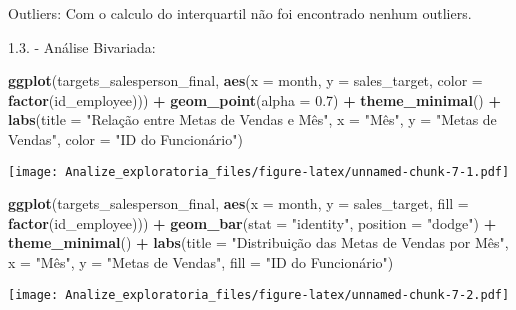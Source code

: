 \documentclass[
]{article}
\newenvironment{Shaded}{\begin{snugshade}}{\end{snugshade}}
\newcommand{\AttributeTok}[1]{\textcolor[rgb]{0.13,0.29,0.53}{#1}}
\newcommand{\FloatTok}[1]{\textcolor[rgb]{0.00,0.00,0.81}{#1}}
\newcommand{\FunctionTok}[1]{\textcolor[rgb]{0.13,0.29,0.53}{\textbf{#1}}}
\newcommand{\NormalTok}[1]{#1}
\newcommand{\SpecialCharTok}[1]{\textcolor[rgb]{0.81,0.36,0.00}{\textbf{#1}}}
\newcommand{\StringTok}[1]{\textcolor[rgb]{0.31,0.60,0.02}{#1}}
\begin{document}
Outliers: Com o calculo do interquartil não foi encontrado nenhum
outliers.

1.3. - Análise Bivariada:

\begin{Shaded}
\begin{Highlighting}[]
\FunctionTok{ggplot}\NormalTok{(targets\_salesperson\_final, }\FunctionTok{aes}\NormalTok{(}\AttributeTok{x =}\NormalTok{ month, }\AttributeTok{y =}\NormalTok{ sales\_target, }\AttributeTok{color =} \FunctionTok{factor}\NormalTok{(id\_employee))) }\SpecialCharTok{+}
  \FunctionTok{geom\_point}\NormalTok{(}\AttributeTok{alpha =} \FloatTok{0.7}\NormalTok{) }\SpecialCharTok{+}
  \FunctionTok{theme\_minimal}\NormalTok{() }\SpecialCharTok{+}
  \FunctionTok{labs}\NormalTok{(}\AttributeTok{title =} \StringTok{"Relação entre Metas de Vendas e Mês"}\NormalTok{,}
       \AttributeTok{x =} \StringTok{"Mês"}\NormalTok{,}
       \AttributeTok{y =} \StringTok{"Metas de Vendas"}\NormalTok{,}
       \AttributeTok{color =} \StringTok{"ID do Funcionário"}\NormalTok{)}
\end{Highlighting}
\end{Shaded}

\texttt{[image: Analize\_exploratoria\_files/figure-latex/unnamed-chunk-7-1.pdf]}

\begin{Shaded}
\begin{Highlighting}[]
\FunctionTok{ggplot}\NormalTok{(targets\_salesperson\_final, }\FunctionTok{aes}\NormalTok{(}\AttributeTok{x =}\NormalTok{ month, }\AttributeTok{y =}\NormalTok{ sales\_target, }\AttributeTok{fill =} \FunctionTok{factor}\NormalTok{(id\_employee))) }\SpecialCharTok{+}
  \FunctionTok{geom\_bar}\NormalTok{(}\AttributeTok{stat =} \StringTok{"identity"}\NormalTok{, }\AttributeTok{position =} \StringTok{"dodge"}\NormalTok{) }\SpecialCharTok{+}
  \FunctionTok{theme\_minimal}\NormalTok{() }\SpecialCharTok{+}
  \FunctionTok{labs}\NormalTok{(}\AttributeTok{title =} \StringTok{"Distribuição das Metas de Vendas por Mês"}\NormalTok{,}
       \AttributeTok{x =} \StringTok{"Mês"}\NormalTok{,}
       \AttributeTok{y =} \StringTok{"Metas de Vendas"}\NormalTok{,}
       \AttributeTok{fill =} \StringTok{"ID do Funcionário"}\NormalTok{)}
\end{Highlighting}
\end{Shaded}

\texttt{[image: Analize\_exploratoria\_files/figure-latex/unnamed-chunk-7-2.pdf]}
\end{document}
